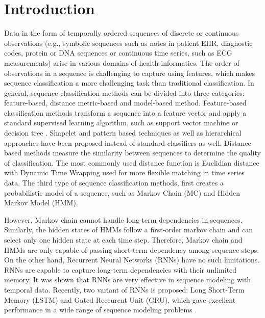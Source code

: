 \documentclass{amia_summit_2018}
\begin{document}
\section*{Introduction}
Data in the form of temporally ordered sequences of discrete or continuous observations (e.g., symbolic sequences such as notes in patient EHR, diagnostic codes, protein or DNA sequences or continuous time series, such as ECG measurements) arise in various domains of health informatics. The order of observations in a sequence is challenging to capture using features, which makes sequence classification a more challenging task than traditional classification. In general, sequence classification methods can be divided into three categories: feature-based, distance metric-based and model-based method. Feature-based classification methods transform a sequence into a feature vector and apply a standard supervised learning algorithm, such as support vector machine \cite{leslie2004fast} or decision tree \cite{chuzhanova1998feature}. Shapelet \cite{ye2009time} and pattern \cite{kudenko1998feature, lesh1999mining} based techniques as well as hierarchical approaches \cite{nallam2016effective} have been proposed instead of standard classifiers as well. Distance-based methods measure the similarity between sequences to determine the quality of classification. The most commonly used distance function is Euclidian distance \cite{keogh2003need} with Dynamic Time Wrapping \cite{keogh2000scaling} used for more flexible matching in time series data. The third type of sequence classification methods, first creates a probabilistic model of a sequence, such as Markov Chain (MC) and Hidden Markov Model \cite{rabiner1989tutorial} (HMM). 

However, Markov chain cannot handle long-term dependencies in sequences. Similarly, the hidden states of HMMs follow a first-order markov chain and can select only one hidden state at each time step. Therefore, Markov chain and HMMs are only capable of passing short-term dependency among sequence steps. On the other hand, Recurrent Neural Networks (RNNs) have no such limitations. RNNs are capable to capture long-term dependencies with their unlimited memory. It was shown that RNNs are very effective in sequence modeling with temporal data.  Recently, two variant of RNNs is proposed: Long Short-Term Memory\cite{graves2013speech} (LSTM) and Gated Reccurent Unit\cite{chung2014empirical} (GRU), which gave excellent performance in a wide range of sequence modeling problems \cite{nion2013handwritten, lipton2015learning, choi2016doctor}.       
\end{document}
